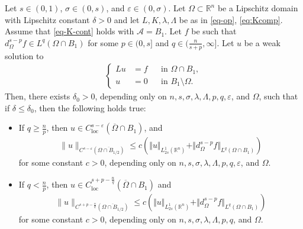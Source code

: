 \documentclass[11pt,reqno]{amsart}
\theoremstyle{plain}
\theoremstyle{definition}
\numberwithin{equation}{section}
\newcommand{\R}{\mathbb{R}}
\newcommand{\eps}{\varepsilon}
\newcommand{\1}{\mathbbm{1}}
\begin{document}
\begin{theorem}
\label{thm:Cs-eps}
Let $s \in (0,1)$, $\sigma \in (0,s)$, and $\varepsilon \in (0, \sigma)$. Let $\Omega \subset \R^n$ be a Lipschitz domain with Lipschitz constant $\delta > 0$ and let $L,K,\lambda,\Lambda$ be as in \eqref{eq-op}, \eqref{eq:Kcomp}. Assume that \eqref{eq-K-cont} holds with $\mathcal{A} = B_1$. Let $f$ be such that $d_{\Omega}^{s-p}f \in L^q(\Omega \cap B_1)$ for some $p \in (0, s]$ and $q \in (\frac{n}{s+p}, \infty]$.
Let $u$ be a weak solution to
\begin{align*}
\left\{
\begin{aligned}
Lu&=f &&\text{in }\Omega \cap B_1, \\
u&=0 &&\text{in } B_1 \setminus \Omega.
\end{aligned}
\right.
\end{align*}
Then, there exists $\delta_0 > 0$, depending only on $n,s,\sigma,\lambda,\Lambda,p,q,\eps$, and $\Omega$, such that if $\delta \le \delta_0$, then the following holds true:
\begin{itemize}
\item If $q\geq \frac{n}{p}$, then $u \in C^{s-\varepsilon}_{\mathrm{loc}}(\overline{\Omega} \cap B_1)$, and
\begin{align*}
\|u\|_{C^{s-\varepsilon}(\overline{\Omega \cap B_{1/2}})} \le c \left( \Vert u \Vert_{L^{1}_{2s}(\R^n)}+ \Vert d_{\Omega}^{s-p}f \Vert_{L^q(\Omega \cap B_1)} \right)
\end{align*}
for some constant $c > 0$, depending only on $n, s, \sigma, \lambda, \Lambda, p, q, \varepsilon$, and $\Omega$.
\item
If $q< \frac{n}{p}$, then $u \in C^{s+p-\frac{n}{q}}_{\mathrm{loc}}(\overline{\Omega} \cap B_1)$ and
\begin{align*}
\|u\|_{C^{s+p-\frac{n}{q}}(\overline{\Omega \cap B_{1/2}})} \le c \left( \Vert u \Vert_{L^{1}_{2s}(\R^n)}  + \Vert d_{\Omega}^{s-p}f \Vert_{L^q(\Omega \cap B_1)} \right)
\end{align*}
for some constant $c > 0$, depending only on $n, s, \sigma, \lambda, \Lambda, p, q$, and $\Omega$.
\end{itemize}
\end{theorem}
\end{document}
